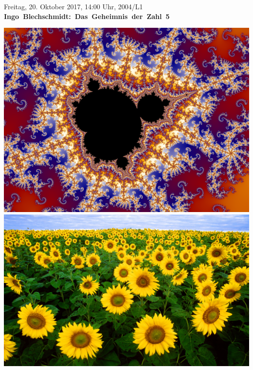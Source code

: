 \documentclass[a4paper,ngerman,landscape,12pt]{scrartcl}
\begin{document}
\begin{center}
  \Huge
  \vspace*{0.0em}
  Freitag, 20. Oktober 2017, 14:00 Uhr, 2004/L1 \\
  \mbox{\textbf{Ingo Blechschmidt: Das Geheimnis der Zahl 5}}

  \vspace{0.3em}
  \includegraphics[height=0.3\textheight]{mandelbrot}
  \includegraphics[height=0.3\textheight]{sonnenblumen}

\end{center}
\end{document}
